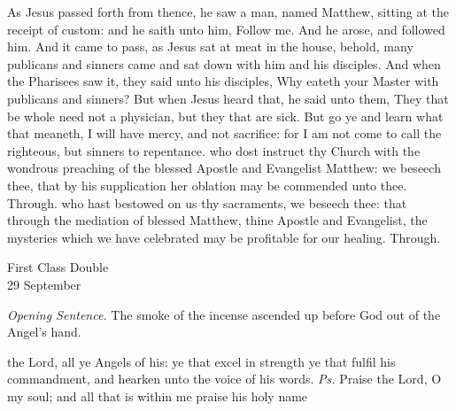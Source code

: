 
 As Jesus passed forth from thence, he saw a man, named Matthew, sitting at the receipt of custom: and he saith unto him, Follow me. And he arose, and followed him. And it came to pass, as Jesus sat at meat in the house, behold, many publicans and sinners came and sat down with him and his disciples. And when the Pharisees saw it, they said unto his disciples, Why eateth your Master with publicans and sinners? But when Jesus heard that, he said unto them, They that be whole need not a physician, but they that are sick. But go ye and learn what that meaneth, I will have mercy, and not sacrifice: for I am not come to call the righteous, but sinners to repentance.
\secret
{} who dost instruct thy Church with the wondrous preaching of the blessed Apostle and Evangelist Matthew: we beseech thee, that by his supplication her oblation may be commended unto thee. Through.
\postcommunion
{} who hast bestowed on us thy sacraments, we beseech thee: that through the mediation of blessed Matthew, thine Apostle and Evangelist, the mysteries which we have celebrated may be profitable for our healing. Through.


\clearpage
{}
\begin{inhead}
    {First Class Double\\
29 September}
\end{inhead}
\par\noindent
\textit{Opening Sentence.} The smoke of the incense ascended up before God out of the Angel's hand.

\introit
{} the Lord, all ye Angels of his: ye that excel in strength ye that fulfil his commandment, and hearken unto the voice of his words. \textit{Ps.} Praise the Lord, O my soul; and all that is within me praise his holy name

